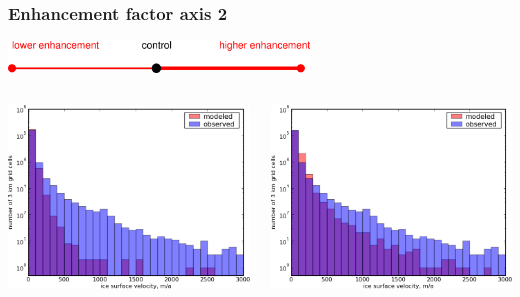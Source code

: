 \documentclass{beamer}
\begin{document}
\begin{frame}
  \frametitle{Enhancement factor axis 2}

\vspace{-0.1in}
\begin{center}
  \includegraphics[width=0.6\textwidth]{enhancement_axis}
\end{center}

\vspace{-0.1in}
\begin{columns}
\begin{column}{0.33\textwidth}
\begin{center}
  \includegraphics[width=1.0\textwidth]{g3km_1_25_98_hist}
\end{center}
\end{column}
\begin{column}{0.33\textwidth}
\begin{center}
  \includegraphics[width=1.0\textwidth]{g3km_3_25_98_hist}

\end{center}
\end{column}
\end{columns}
\end{frame}
\end{document}
